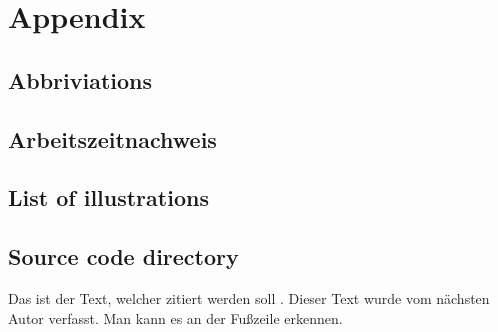 \newpage
{}

\section{Appendix}

\subsection{Abbriviations}

\subsection{Arbeitszeitnachweis}

\subsection{List of illustrations}

\subsection{Source code directory}	

Das ist der Text, welcher zitiert werden soll \autocite{htl-kaindorf:web}. Dieser Text wurde vom nächsten Autor verfasst. Man kann es an der Fußzeile erkennen.

